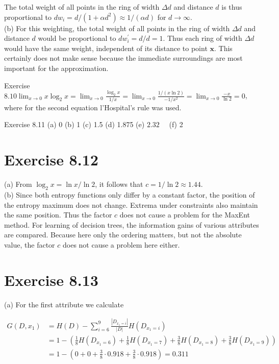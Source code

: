 \documentclass[10pt]{article}
\begin{document}
The total weight of all points in the ring of width $\Delta d$ and distance $d$ is thus proportional to $d w_{i}=d /\left(1+\alpha d^{2}\right) \approx 1 /(\alpha d)$ for $d \rightarrow \infty$.\\
(b) For this weighting, the total weight of all points in the ring of width $\Delta d$ and distance $d$ would be proportional to $d w_{i}^{\prime}=d / d=1$. Thus each ring of width $\Delta d$ would have the same weight, independent of its distance to point $\boldsymbol{x}$. This certainly does not make sense because the immediate surroundings are most important for the approximation.

Exercise $8.10 \lim _{x \rightarrow 0} x \log _{2} x=\lim _{x \rightarrow 0} \frac{\log _{2} x}{1 / x}=\lim _{x \rightarrow 0} \frac{1 /(x \ln 2)}{-1 / x^{2}}=\lim _{x \rightarrow 0} \frac{-x}{\ln 2}=0$, where for the second equation l'Hospital's rule was used.


Exercise 8.11 (a) 0 (b) 1 (c) 1.5 (d) 1.875 (e) $2.32 \quad$ (f) 2

\section*{Exercise 8.12}
(a) From $\log _{2} x=\ln x / \ln 2$, it follows that $c=1 / \ln 2 \approx 1.44$.\\
(b) Since both entropy functions only differ by a constant factor, the position of the entropy maximum does not change. Extrema under constraints also maintain the same position. Thus the factor $c$ does not cause a problem for the MaxEnt method. For learning of decision trees, the information gains of various attributes are compared. Because here only the ordering matters, but not the absolute value, the factor $c$ does not cause a problem here either.

\section*{Exercise 8.13}
(a) For the first attribute we calculate

$$
\begin{aligned}
G\left(D, x_{1}\right) & =H(D)-\sum_{i=6}^{9} \frac{\left|D_{x_{1}=i}\right|}{|D|} H\left(D_{x_{1}=i}\right) \\
& =1-\left(\frac{1}{8} H\left(D_{x_{1}=6}\right)+\frac{1}{8} H\left(D_{x_{1}=7}\right)+\frac{3}{8} H\left(D_{x_{1}=8}\right)+\frac{3}{8} H\left(D_{x_{1}=9}\right)\right) \\
& =1-\left(0+0+\frac{3}{8} \cdot 0.918+\frac{3}{8} \cdot 0.918\right)=0.311
\end{aligned}
$$
\end{document}
